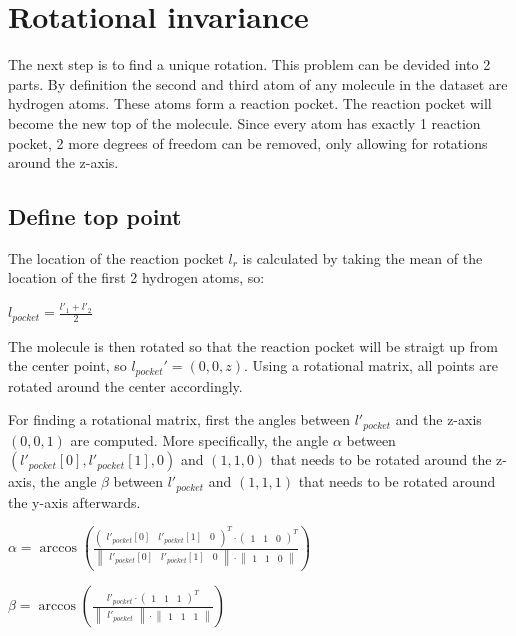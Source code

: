 \section{Rotational invariance}

The next step is to find a unique rotation.
This problem can be devided into 2 parts.
By definition the second and third atom of any molecule in the dataset are hydrogen atoms.
These atoms form a reaction pocket. %
The reaction pocket will become the new top of the molecule.
Since every atom has exactly 1 reaction pocket, 2 more degrees of freedom can be removed, only allowing for rotations around the z-axis.


\subsection{Define top point}

The location of the reaction pocket $l_r$ is calculated by taking the mean of the location of the first 2 hydrogen atoms, so:

$l_{pocket} = \frac{l'_1 + l'_2}{2}$

The molecule is then rotated so that the reaction pocket will be straigt up from the center point, so $l_{pocket}' = (0,0,z)$.
Using a rotational matrix, all points are rotated around the center accordingly.

For finding a rotational matrix, first the angles between $l'_{pocket}$ and the z-axis $(0,0,1)$ are computed.
More specifically, the angle $\alpha$ between $(l'_{pocket}[0], l'_{pocket}[1], 0)$ and $(1,1,0)$ that needs to be rotated around the z-axis, 
the angle $\beta$ between $l'_{pocket}$ and $(1,1,1)$ that needs to be rotated around the y-axis afterwards.

$\alpha = \arccos \left(
  \frac{
  \begin{pmatrix}
    l'_{pocket}[0] &
    l'_{pocket}[1] &
    0
  \end{pmatrix}^T
  \cdot 
  \begin{pmatrix}
    1 &
    1 &
    0
  \end{pmatrix}^T}
  {
  \begin{Vmatrix}
    l'_{pocket}[0] &
    l'_{pocket}[1] &
    0
  \end{Vmatrix}
  \cdot 
  \begin{Vmatrix}
    1 &
    1 &
    0
  \end{Vmatrix}}
\right)
$

$\beta = \arccos \left(
  \frac{
    l'_{pocket}
  \cdot 
  \begin{pmatrix}
    1 &
    1 &
    1
  \end{pmatrix}^T}
  {
  \begin{Vmatrix}
    l'_{pocket}
  \end{Vmatrix}
  \cdot 
  \begin{Vmatrix}
    1 &
    1 &
    1
  \end{Vmatrix}}
\right)
$

